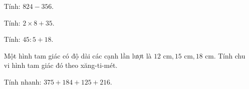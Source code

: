 \begin{ex} %
Tính: $824 - 356$.
\end{ex}

\begin{ex} %
Tính: $2 \times 8 + 35$.
\end{ex}

\begin{ex} %
Tính: $45 : 5 + 18$.
\end{ex}

\begin{ex} %
Một hình tam giác có độ dài các cạnh lần lượt là $12\text{ cm}, 15\text{ cm}, 18\text{ cm}$. Tính chu vi hình tam giác đó theo xăng-ti-mét.
\end{ex}

\begin{ex} %
Tính nhanh: $375 + 184 + 125 + 216$.
\end{ex}

